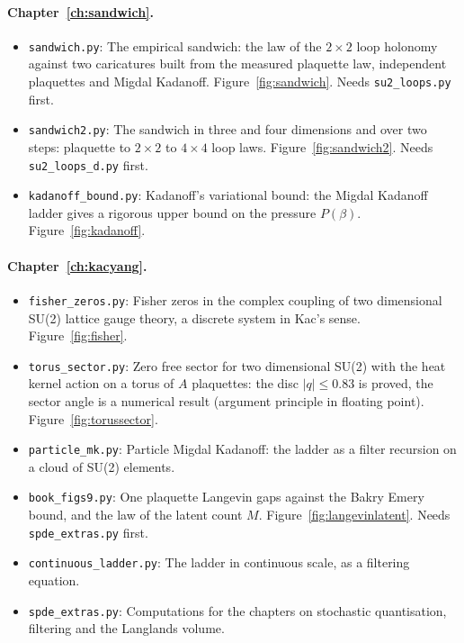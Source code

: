 \paragraph{Chapter~\ref{ch:sandwich}.}\nopagebreak
\begin{itemize}\setlength{\itemsep}{0pt}\setlength{\parskip}{0pt}
\item \texttt{sandwich.py}: The empirical sandwich: the law of the $2\times 2$ loop holonomy against two caricatures built from the measured plaquette law, independent plaquettes and Migdal Kadanoff. Figure~\ref{fig:sandwich}. Needs \texttt{su2\_loops.py} first.
\item \texttt{sandwich2.py}: The sandwich in three and four dimensions and over two steps: plaquette to $2\times 2$ to $4\times 4$ loop laws. Figure~\ref{fig:sandwich2}. Needs \texttt{su2\_loops\_d.py} first.
\item \texttt{kadanoff\_bound.py}: Kadanoff's variational bound: the Migdal Kadanoff ladder gives a rigorous upper bound on the pressure $P(\beta)$. Figure~\ref{fig:kadanoff}.
\end{itemize}
\paragraph{Chapter~\ref{ch:kacyang}.}\nopagebreak
\begin{itemize}\setlength{\itemsep}{0pt}\setlength{\parskip}{0pt}
\item \texttt{fisher\_zeros.py}: Fisher zeros in the complex coupling of two dimensional SU(2) lattice gauge theory, a discrete system in Kac's sense. Figure~\ref{fig:fisher}.
\item \texttt{torus\_sector.py}: Zero free sector for two dimensional SU(2) with the heat kernel action on a torus of $A$ plaquettes: the disc $|q|\le0.83$ is proved, the sector angle is a numerical result (argument principle in floating point). Figure~\ref{fig:torussector}.
\item \texttt{particle\_mk.py}: Particle Migdal Kadanoff: the ladder as a filter recursion on a cloud of SU(2) elements.
\item \texttt{book\_figs9.py}: One plaquette Langevin gaps against the Bakry Emery bound, and the law of the latent count $M$. Figure~\ref{fig:langevinlatent}. Needs \texttt{spde\_extras.py} first.
\item \texttt{continuous\_ladder.py}: The ladder in continuous scale, as a filtering equation.
\item \texttt{spde\_extras.py}: Computations for the chapters on stochastic quantisation, filtering and the Langlands volume.
\end{itemize}
